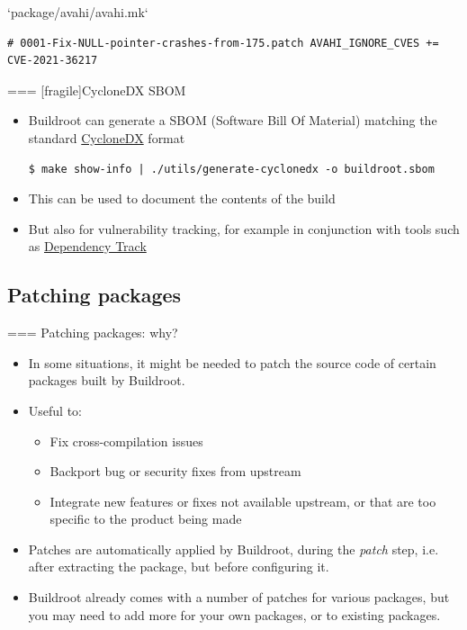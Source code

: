   \begin{block}{`package/avahi/avahi.mk`}
\begin{verbatim}
# 0001-Fix-NULL-pointer-crashes-from-175.patch AVAHI_IGNORE_CVES += CVE-2021-36217
\end{verbatim}
  \end{block}



=== [fragile]{CycloneDX SBOM}
  \begin{itemize}
  \item Buildroot can generate a SBOM (Software Bill Of Material)
    matching the standard \href{https://cyclonedx.org/}{CycloneDX}
    format
  \begin{block}{}
\begin{verbatim}
$ make show-info | ./utils/generate-cyclonedx -o buildroot.sbom
\end{verbatim}
  \end{block}
  \item This can be used to document the contents of the build
  \item But also for vulnerability tracking, for example in
    conjunction with tools such as
    \href{https://dependencytrack.org/}{Dependency Track}
  \end{itemize}


\subsection{Patching packages}

=== {Patching packages: why?}
  \begin{itemize}
  \item In some situations, it might be needed to patch the source
    code of certain packages built by Buildroot.
  \item Useful to:
    \begin{itemize}
    \item Fix cross-compilation issues
    \item Backport bug or security fixes from upstream
    \item Integrate new features or fixes not available upstream, or
      that are too specific to the product being made
    \end{itemize}
  \item Patches are automatically applied by Buildroot, during the
    {\em patch} step, i.e. after extracting the package, but before
    configuring it.
  \item Buildroot already comes with a number of patches for various
    packages, but you may need to add more for your own packages, or
    to existing packages.
  \end{itemize}


